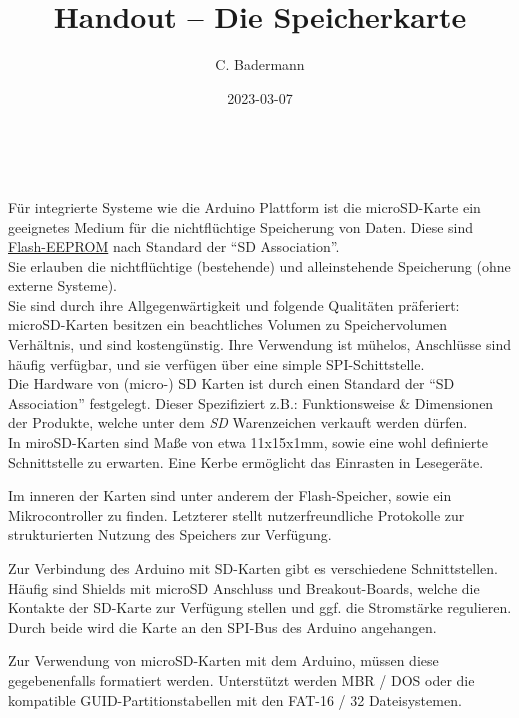 \documentclass[ngerman]{handout}
\date{2023-03-07}
\author{C. Badermann}
\title{Handout -- Die Speicherkarte}
\begin{document}
  \maketitle\\

  \begin{multicols*}{2}
    Für integrierte Systeme wie die Arduino Plattform ist die microSD-Karte ein geeignetes Medium für die nichtflüchtige Speicherung von Daten.
    Diese sind \href{https://de.wikipedia.org/wiki/Flash-Speicher}{Flash-EEPROM} nach Standard der \enquote{SD Association}.\\
    Sie erlauben die nichtflüchtige (bestehende) und alleinstehende Speicherung (ohne externe Systeme).\\

    Sie sind durch ihre Allgegenwärtigkeit und folgende Qualitäten präferiert:
    microSD-Karten besitzen ein beachtliches Volumen zu Speichervolumen Verhältnis, und sind kostengünstig. Ihre Verwendung ist mühelos, Anschlüsse sind häufig verfügbar, und sie verfügen über eine simple SPI-Schittstelle.\\

    Die Hardware von (micro-) SD Karten ist durch einen Standard der \enquote{SD Association} festgelegt.
    Dieser Spezifiziert z.B.: Funktionsweise \& Dimensionen der Produkte, welche unter dem \emph{SD} Warenzeichen verkauft werden dürfen.\\

    In miroSD-Karten sind Maße von etwa 11x15x1{mm}, sowie eine wohl definierte Schnittstelle zu erwarten.
    Eine Kerbe ermöglicht das Einrasten in Lesegeräte.

    Im inneren der Karten sind unter anderem der Flash-Speicher, sowie ein Mikrocontroller zu finden.
    Letzterer stellt nutzerfreundliche Protokolle zur strukturierten Nutzung des Speichers zur Verfügung.

    Zur Verbindung des Arduino mit SD-Karten gibt es verschiedene Schnittstellen.
    Häufig sind Shields mit microSD Anschluss und Breakout-Boards,
    welche die Kontakte der SD-Karte zur Verfügung stellen und ggf. die Stromstärke regulieren.
    Durch beide wird die Karte an den SPI-Bus des Arduino angehangen.

    Zur Verwendung von microSD-Karten mit dem Arduino, müssen diese gegebenenfalls formatiert werden.
    Unterstützt werden MBR / DOS oder die kompatible GUID-Partitionstabellen mit den FAT-16 / 32 Dateisystemen\cite{sd-lib}.\\


\end{multicols*}
\end{document}
